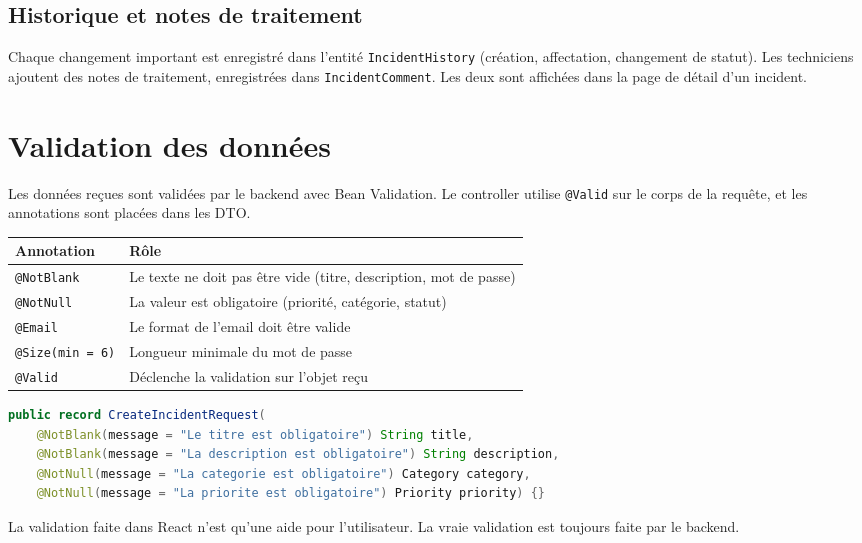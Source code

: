\documentclass{rapportENSET}
\begin{document}
\subsection{Historique et notes de traitement}

Chaque changement important est enregistr\'e dans l'entit\'e \texttt{IncidentHistory} (cr\'eation, affectation, changement de statut). Les techniciens ajoutent des notes de traitement, enregistr\'ees dans \texttt{IncidentComment}. Les deux sont affich\'ees dans la page de d\'etail d'un incident.

\section{Validation des donn\'ees}

Les donn\'ees re\c{c}ues sont valid\'ees par le backend avec Bean Validation. Le controller utilise \texttt{@Valid} sur le corps de la requ\^ete, et les annotations sont plac\'ees dans les DTO.

\begin{center}
\begin{tabular}{lp{9cm}}
\toprule
\textbf{Annotation} & \textbf{R\^ole} \\
\midrule
\texttt{@NotBlank} & Le texte ne doit pas \^etre vide (titre, description, mot de passe) \\
\texttt{@NotNull} & La valeur est obligatoire (priorit\'e, cat\'egorie, statut) \\
\texttt{@Email} & Le format de l'email doit \^etre valide \\
\texttt{@Size(min = 6)} & Longueur minimale du mot de passe \\
\texttt{@Valid} & D\'eclenche la validation sur l'objet re\c{c}u \\
\bottomrule
\end{tabular}
\end{center}

\begin{lstlisting}[language=Java]
public record CreateIncidentRequest(
    @NotBlank(message = "Le titre est obligatoire") String title,
    @NotBlank(message = "La description est obligatoire") String description,
    @NotNull(message = "La categorie est obligatoire") Category category,
    @NotNull(message = "La priorite est obligatoire") Priority priority) {}
\end{lstlisting}

\begin{alertbox}
La validation faite dans React n'est qu'une aide pour l'utilisateur. La vraie validation est toujours faite par le backend.
\end{alertbox}
\end{document}
